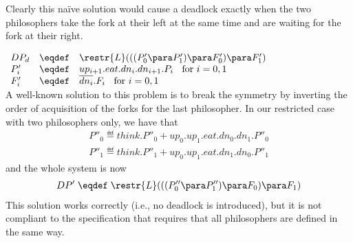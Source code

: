 Clearly this na\"ive solution would cause a deadlock exactly when the two philosophers take the fork at their left at the same time  and are waiting for the fork at their right. 

 $\begin{array}{llllllll}
DP_d  & \eqdef  & \restr{L}(((P'_0\para P'_1) \para F'_0) \para F'_1) \\
P'_i & \eqdef &  up_{i+1}.eat.dn_i.dn_{i+1}.P_i  \; \;  \mbox{   for  }i = 0, 1\\
F'_i & \eqdef & \overline{dn_i}.F_i \; \;  \mbox{   for  }i = 0, 1 
 \end{array}$\\

% 


A well-known solution to this problem is to break the symmetry by inverting the order of acquisition of the forks for the last philosopher. In our restricted case with two philosophers only, we have that
\begin{eqnarray*}
P''_0 \eqdef think.P''_0 +  up_0.up_1.eat.dn_0.dn_1.P''_0  \\
P''_1 \eqdef think.P''_1 +  up_0.up_1.eat.dn_1.dn_0.P''_1 
\end{eqnarray*}
and the whole system is now
\begin{eqnarray*}
DP' \;  \eqdef \;  \restr{L}(((P''_0\para P''_1) \para F_0) \para F_1) 
\end{eqnarray*}
This solution works correctly (i.e., no deadlock is introduced), but it is not compliant to the specification that requires that all philosophers are defined in the same way.


